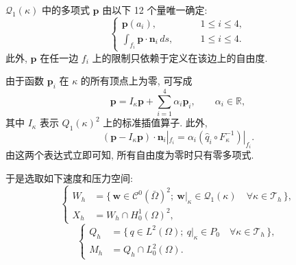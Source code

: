 \setcounter{statement}{0}
\renewcommand{\theHstatement}{lemma.\thesection.\arabic{statement}}
\begin{Lemma}\label{lem:primitive-quadrilateral-first-unisolvence}
$\mathcal Q_1(\kappa)$ 中的多项式 $\mathbf p$ 由以下 12 个量唯一确定:
\begin{equation}\label{eq:primitive-quadrilateral-first-dofs}
\left\{
\begin{aligned}
\mathbf p(a_i),&\qquad 1\leq i\leq4,\\
\int_{f_i}\mathbf p\cdot\mathbf n_i\,ds,&\qquad1\leq i\leq4.
\end{aligned}
\right.
\end{equation}
此外, $\mathbf p$ 在任一边 $f_i$ 上的限制只依赖于定义在该边上的自由度.
\end{Lemma}

\begin{Proof}
由于函数 $\mathbf p_i$ 在 $\kappa$ 的所有顶点上为零, 可写成
\begin{equation}\label{eq:primitive-quadrilateral-first-decomposition}
\mathbf p=I_\kappa\mathbf p+\sum_{i=1}^{4}\alpha_i\mathbf p_i,
\qquad \alpha_i\in\mathbb R,
\end{equation}
其中 $I_\kappa$ 表示 $Q_1(\kappa)^2$ 上的标准插值算子. 此外,
\begin{equation}\label{eq:primitive-quadrilateral-first-normal-trace}
(\mathbf p-I_\kappa\mathbf p)\cdot\mathbf n_i|_{f_i}
=\alpha_i(\hat q_i\circ F_\kappa^{-1})|_{f_i}.
\end{equation}
由这两个表达式立即可知, 所有自由度为零时只有零多项式.
\end{Proof}

于是选取如下速度和压力空间:
\begin{equation}\label{eq:primitive-quadrilateral-first-velocity-spaces}
\left\{
\begin{aligned}
W_h&=\{\,\mathbf w\in\mathcal C^0(\bar\Omega)^2;
\ \mathbf w|_\kappa\in\mathcal Q_1(\kappa)
\quad\forall\kappa\in\mathcal T_h\,\},\\
X_h&=W_h\cap H_0^1(\Omega)^2,
\end{aligned}
\right.
\end{equation}
\begin{equation}\label{eq:primitive-quadrilateral-first-pressure-spaces}
\left\{
\begin{aligned}
Q_h&=\{\,q\in L^2(\Omega);\ q|_\kappa\in P_0
\quad\forall\kappa\in\mathcal T_h\,\},\\
M_h&=Q_h\cap L_0^2(\Omega).
\end{aligned}
\right.
\end{equation}

